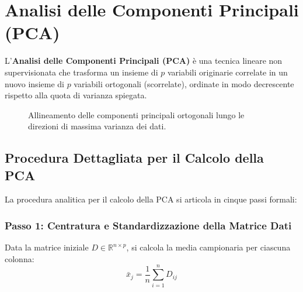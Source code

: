 \FloatBarrier
\section{Analisi delle Componenti Principali (PCA)}
\label{sec:dm-pca}

L'\textbf{Analisi delle Componenti Principali (PCA)} è una tecnica lineare non supervisionata che trasforma un insieme di $p$ variabili originarie correlate in un nuovo insieme di $p$ variabili ortogonali (scorrelate), ordinate in modo decrescente rispetto alla quota di varianza spiegata.

\begin{figure}[H]
    \centering
    \caption{Allineamento delle componenti principali ortogonali lungo le direzioni di massima varianza dei dati.}
    \label{fig:dm-pca-axes}
\end{figure}

\FloatBarrier
\subsection{Procedura Dettagliata per il Calcolo della PCA}

La procedura analitica per il calcolo della PCA si articola in cinque passi formali:

\subsubsection{Passo 1: Centratura e Standardizzazione della Matrice Dati}
Data la matrice iniziale $D \in \mathbb{R}^{n \times p}$, si calcola la media campionaria per ciascuna colonna:
\begin{equation}
    \bar{x}_j = \frac{1}{n}\sum_{i=1}^n D_{ij}
\end{equation}

